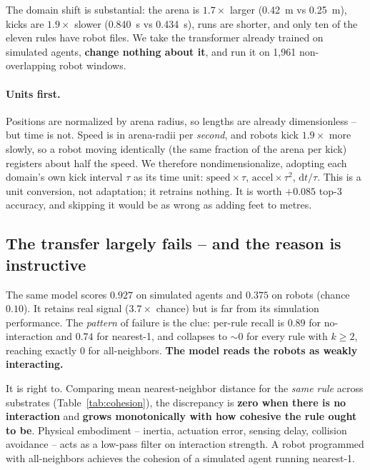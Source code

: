 \documentclass[11pt]{article}
\begin{document}
The domain shift is substantial: the arena is $1.7\times$ larger
(\SI{0.42}{\metre} vs \SI{0.25}{\metre}), kicks are $1.9\times$ slower
(\SI{0.840}{\second} vs \SI{0.434}{\second}), runs are shorter, and only ten of the
eleven rules have robot files. We take the transformer already trained on simulated
agents, \textbf{change nothing about it}, and run it on 1,961 non-overlapping robot
windows.

\paragraph{Units first.}
Positions are normalized by arena radius, so lengths are already dimensionless -- but
time is not. Speed is in arena-radii per \emph{second}, and robots kick $1.9\times$
more slowly, so a robot moving identically (the same fraction of the arena per kick)
registers about half the speed. We therefore nondimensionalize, adopting each domain's
own kick interval $\tau$ as its time unit: $\text{speed}\times\tau$,
$\text{accel}\times\tau^{2}$, $\mathrm{d}t/\tau$. This is a unit conversion, not
adaptation; it retrains nothing. It is worth $+0.085$ top-3 accuracy, and skipping it
would be as wrong as adding feet to metres.

\subsection{The transfer largely fails -- and the reason is instructive}

The same model scores $0.927$ on simulated agents and $\mathbf{0.375}$ on robots
(chance $0.10$). It retains real signal ($3.7\times$ chance) but is far from its
simulation performance. The \emph{pattern} of failure is the clue: per-rule recall is
$0.89$ for no-interaction and $0.74$ for nearest-1, and collapses to ${\sim}0$ for
every rule with $k \ge 2$, reaching exactly $0$ for all-neighbors. \textbf{The model
reads the robots as weakly interacting.}

It is right to. Comparing mean nearest-neighbor distance for the \emph{same rule}
across substrates (Table~\ref{tab:cohesion}), the discrepancy is \textbf{zero when
there is no interaction} and \textbf{grows monotonically with how cohesive the rule
ought to be}. Physical embodiment -- inertia, actuation error, sensing delay,
collision avoidance -- acts as a low-pass filter on interaction strength. A robot
programmed with all-neighbors achieves the cohesion of a simulated agent running
nearest-1.
\end{document}
